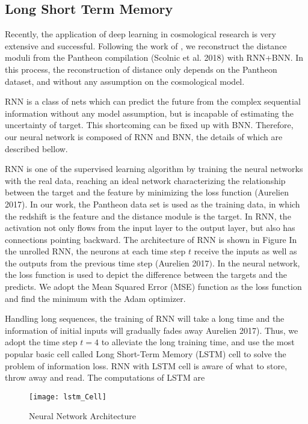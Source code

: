 \subsection{Long Short Term Memory}
Recently, the application of deep learning in cosmological research is very extensive and successful. Following the work of \cite{escamilla2020deep}, we reconstruct the distance moduli from the Pantheon compilation (Scolnic et al. 2018) with RNN+BNN. In this process, the reconstruction of distance only depends on the Pantheon dataset, and without any assumption on the cosmological model.

RNN is a class of nets which can predict the future from the complex sequential information without any model assumption, but is incapable of estimating the uncertainty of target. This shortcoming can be fixed up with BNN. Therefore, our neural network is composed of RNN and BNN, the details of which are described bellow.

RNN is one of the supervised learning algorithm by training the neural networks with the real data, reaching an ideal network characterizing the relationship between the target and the feature by minimizing the loss function (Aurelien 2017). In our work, the Pantheon data set is used as the training data, in which the redshift is the feature and the distance module is the target. In $\mathrm{RNN}$, the activation not only flows from the input layer to the output layer, but also has connections pointing backward. The architecture of RNN is shown in Figure In the unrolled RNN, the neurons at each time step $t$ receive the inputs as well as the outputs from the previous time step (Aurelien 2017$)$. In the neural network, the loss function is used to depict the difference between the targets and the predicts. We adopt the Mean Squared Error (MSE) function as the loss function and find the minimum with the Adam optimizer.

Handling long sequences, the training of RNN will take a long time and the information of initial inputs will gradually fades away Aurelien 2017). Thus, we adopt the time step $t=4$ to alleviate the long training time, and use the most popular basic cell called Long Short-Term Memory (LSTM) cell to solve the problem of information loss. RNN with LSTM cell is aware of what to store, throw away and read. The computations of LSTM are
\begin{figure} [H]
	\centering
	\texttt{[image: lstm\_Cell]}
	\caption{Neural Network Architecture}
	\label{newtork_arch}
\end{figure}

